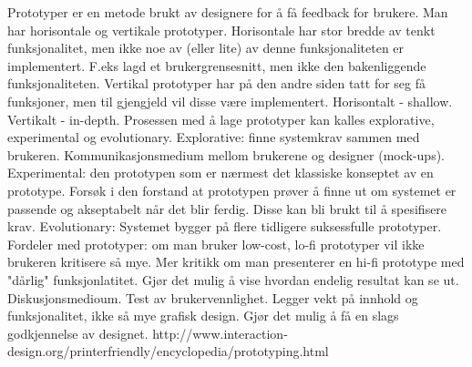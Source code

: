 Prototyper er en metode brukt av designere for å få feedback for brukere. Man har horisontale og vertikale prototyper. Horisontale har stor bredde av tenkt funksjonalitet, men ikke noe av (eller lite) av denne funksjonaliteten er implementert. F.eks lagd et brukergrensesnitt, men ikke den bakenliggende funksjonaliteten. Vertikal prototyper har på den andre siden tatt for seg få funksjoner, men til gjengjeld vil disse være implementert. Horisontalt - shallow. Vertikalt - in-depth. Prosessen med å lage prototyper kan kalles explorative, experimental og evolutionary. Explorative: finne systemkrav sammen med brukeren. Kommunikasjonsmedium mellom brukerene og designer (mock-ups). Experimental: den prototypen som er nærmest det klassiske konseptet av en prototype. Forsøk i den forstand at prototypen prøver å finne ut om systemet er passende og akseptabelt når det blir ferdig. Disse kan bli brukt til å spesifisere krav. Evolutionary: Systemet bygger på flere tidligere suksessfulle prototyper. Fordeler med prototyper: om man bruker low-cost, lo-fi prototyper vil ikke brukeren kritisere så mye. Mer kritikk om man presenterer en hi-fi prototype med "dårlig" funksjonlatitet. Gjør det mulig å vise hvordan endelig resultat kan se ut. Diskusjonsmedioum. Test av brukervennlighet. Legger vekt på innhold og funksjonalitet, ikke så mye grafisk design. Gjør det mulig å få en slags godkjennelse av designet. http://www.interaction-design.org/printerfriendly/encyclopedia/prototyping.html

